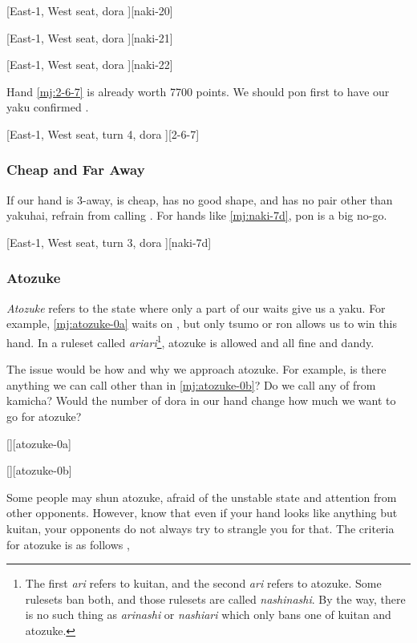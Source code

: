 \documentclass[12pt]{article}
\begin{document}
[East-1, West seat, dora ][naki-20]

[East-1, West seat, dora ][naki-21]

[East-1, West seat, dora ][naki-22]

Hand \ref{mj:2-6-7} is already worth 7700 points. We should pon  first to have our yaku confirmed \citep[][pp.~164--167]{tetsusenryaku}.

[East-1, West seat, turn 4, dora ][2-6-7]


\subsubsection*{Cheap and Far Away}

If our hand is 3-away, is cheap, has no good shape, and has no pair other than yakuhai, refrain from calling \citep[][p.~110]{hirasawa-naki}. For hands like \ref{mj:naki-7d},  pon is a big no-go.

[East-1, West seat, turn 3, dora ][naki-7d]


\subsubsection*{Atozuke}

\textit{Atozuke} refers to the state where only a part of our waits give us a yaku. For example, \ref{mj:atozuke-0a} waits on , but only  tsumo or ron allows us to win this hand. In a ruleset called \textit{ariari}\footnote{The first \textit{ari} refers to kuitan, and the second \textit{ari} refers to atozuke. Some rulesets ban both, and those rulesets are called \textit{nashinashi}. By the way, there is no such thing as \textit{arinashi} or \textit{nashiari} which only bans one of kuitan and atozuke.}, atozuke is allowed and all fine and dandy.

The issue would be how and why we approach atozuke. For example, is there anything we can call other than  in \ref{mj:atozuke-0b}? Do we call any of  from kamicha? Would the number of dora in our hand change how much we want to go for atozuke?

[][atozuke-0a]

[][atozuke-0b]

Some people may shun atozuke, afraid of the unstable state and attention from other opponents. However, know that even if your hand looks like anything but kuitan, your opponents do not always try to strangle you for that. The criteria for atozuke is as follows \citep[][pp.~146--151]{tetsusenryaku},
\end{document}
